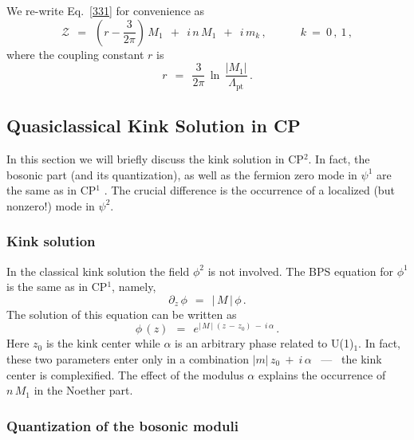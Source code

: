 \documentclass[epsfig,12pt]{article}
\def\beq{\begin{equation}}
\def\eeq{\end{equation}}
\def\beq{\begin{equation}}
\def\eeq{\end{equation}}
\newcommand{\p}{\partial}
\newcommand{\mc}[1]{\mathcal{#1}}
\begin{document}
	We re-write Eq.~\eqref{331} for convenience as 
\beq
\label{weak}
	\mc{Z}  ~~=~~  \left(r -\frac{3}{2\pi} \right)\, M_1  ~~+~~  i\, n  \, M_1
	~~+~~ i\,  m_k  \,, \qquad\quad k ~=~ 0\,,~1\,,
\eeq
	where the coupling constant $ r $ is
\beq
	r  ~~=~~  \frac{3}{2\pi}\,  \ln\, \frac {   |M_1|   }
                                               {  \Lambda_\text{pt}  } \, .
\eeq


\subsection[Quasiclassical Kink Solution in CP$^2$]
	{Quasiclassical Kink Solution in CP}
\label{kinksolu}

	In this section we will briefly discuss the kink solution in CP$^2$. 
	In fact, the bosonic part (and its quantization), 
	as well as the fermion zero mode in $ \psi^1 $ are the same as in CP$^1$ \cite{SYrev}. 
	The crucial difference is the occurrence of a localized (but nonzero!) mode in $ \psi^2 $.


\subsubsection{Kink solution}

	In the classical kink solution the field $ \phi^2 $ is not involved. 
	The BPS equation for $ \phi^1 $ is the same as in CP$^1$, namely,
\beq
	\p_z\, \phi ~~=~~ |\, M \,| \, \phi\,.
\label{13twentysix}
\eeq
	The solution of this equation  can be written as
\beq
	\phi\, (z)  ~~=~~  e^{ |\, M \,|\; (z \,-\, z_0) ~-~ i\,\alpha}\,.
\label{13twentyseven}
\eeq
	Here $ z_0 $ is the kink center while $ \alpha $ is an arbitrary phase related to U(1)$_1$.
	In fact, these two parameters enter only in a combination
	$ | m |\, z_0 ~+~ i\,\alpha $  ~---~  the kink center is complexified. 
	The effect of the modulus $ \alpha $ explains the occurrence of 
	$ n\, M_1 $ in the Noether part.



\subsubsection{Quantization of the bosonic moduli}
\end{document}
